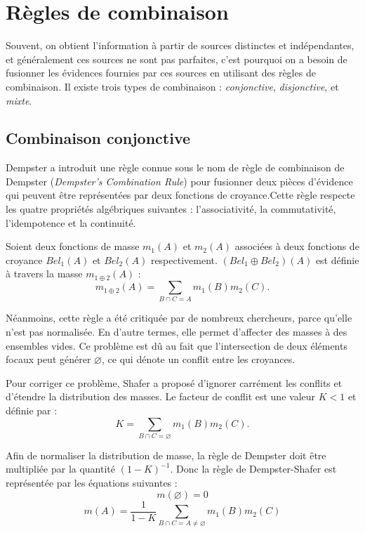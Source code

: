 \section{Règles de combinaison}

Souvent, on obtient l’information à partir de sources distinctes et indépendantes,
et généralement ces sources ne sont pas parfaites, c’est pourquoi on a besoin de
fusionner les évidences fournies par ces sources en utilisant des règles de
combinaison. Il existe trois types de combinaison : \emph{conjonctive},
\emph{disjonctive}, et \emph{mixte}.

\subsection{Combinaison conjonctive}

Dempster a introduit une règle connue sous le nom de règle de combinaison
de Dempster (\emph{Dempster's Combination Rule}) pour fusionner deux pièces
d’évidence qui peuvent être représentées par deux fonctions de croyance.Cette
règle respecte les quatre propriétés algébriques suivantes : l’associativité,
la commutativité, l’idempotence et la continuité.

Soient deux fonctions de masse $m_1(A)$ et $m_2(A)$ associées à deux fonctions
de croyance $Bel_1(A)$ et $Bel_2(A)$ respectivement. $(Bel_1 \oplus Bel_2)(A)$
est définie à travers la masse $m_{1 \oplus 2}(A)$ :
\begin{equation}
m_{1 \oplus 2}(A) = \sum_{B \cap C = A} m_1(B) m_2(C).
\end{equation}

Néanmoins, cette règle a été critiquée par de nombreux chercheurs, parce qu’elle
n’est pas normalisée. En d’autre termes, elle permet d’affecter des masses à
des ensembles vides. Ce problème est dû au fait que l’intersection de deux
éléments focaux peut générer $\varnothing$, ce qui dénote un conflit entre les croyances.

Pour corriger ce problème, Shafer a proposé d’ignorer carrément les conflits
et d'étendre la distribution des masses. Le facteur de conflit est une valeur
$K < 1$ et définie par :
\begin{equation}
K = \sum_{B \cap C = \varnothing} m_1(B) m_2(C).
\end{equation}

Afin de normaliser la distribution de masse, la règle de Dempster doit être
multipliée par la quantité $(1 - K)^{-1}$. Donc la règle de Dempster-Shafer
est représentée par les équations suivantes :
\begin{equation}
m(\varnothing) = 0
\end{equation}
\begin{equation}
m(A) = \frac{1}{1-K} \sum_{B \cap C = A \neq \varnothing} m_1(B) m_2(C)
\end{equation}

